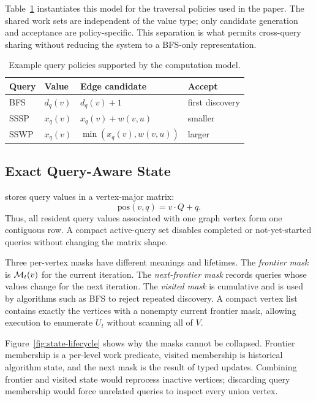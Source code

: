 Table~\ref{tab:policies} instantiates this model for the traversal policies used in the paper.  The shared work sets are independent of the value type; only candidate generation and acceptance are policy-specific.  This separation is what permits cross-query sharing without reducing the system to a BFS-only representation.

\begin{table}[t]
  \centering
  \caption{Example query policies supported by the computation model.}
  \label{tab:policies}
  \small
  \setlength{\tabcolsep}{3pt}
  \begin{tabular}{llll}
    \toprule
    Query & Value & Edge candidate & Accept \\
    \midrule
    BFS & $d_q(v)$ & $d_q(v)+1$ & first discovery \\
    SSSP & $x_q(v)$ & $x_q(v)+w(v,u)$ & smaller \\
    SSWP & $x_q(v)$ & $\min(x_q(v),w(v,u))$ & larger \\
    \bottomrule
  \end{tabular}
\end{table}

\subsection{Exact Query-Aware State}

\system stores query values in a vertex-major matrix:
\begin{equation}
  \mathrm{pos}(v,q)=v\cdot Q+q.
\end{equation}
Thus, all resident query values associated with one graph vertex form one contiguous row.  A compact active-query set disables completed or not-yet-started queries without changing the matrix shape.

Three per-vertex masks have different meanings and lifetimes.  The \emph{frontier mask} is $\mathcal{M}_t(v)$ for the current iteration.  The \emph{next-frontier mask} records queries whose values change for the next iteration.  The \emph{visited mask} is cumulative and is used by algorithms such as BFS to reject repeated discovery.  A compact vertex list contains exactly the vertices with a nonempty current frontier mask, allowing execution to enumerate $U_t$ without scanning all of $V$.

Figure~\ref{fig:state-lifecycle} shows why the masks cannot be collapsed.  Frontier membership is a per-level work predicate, visited membership is historical algorithm state, and the next mask is the result of typed updates.  Combining frontier and visited state would reprocess inactive vertices; discarding query membership would force unrelated queries to inspect every union vertex.

